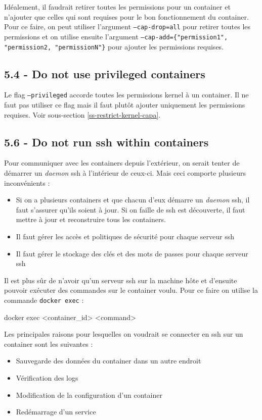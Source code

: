 \documentclass[11pt,a4paper,oneside]{report}
\newcommand{\code}[1]{\texttt{#1}}
\begin{document}
Idéalement, il faudrait retirer toutes les permissions pour un container et n'ajouter que celles qui sont requises pour le bon fonctionnement du container. Pour ce faire, on peut utiliser l'argument \code{--cap-drop=all} pour retirer toutes les permissions et on utilise ensuite l'argument \code{--cap-add=\{"permission1", "permission2, "permissionN"\}} pour ajouter les permissions requises.

\subsection{5.4  - Do not use privileged containers}
Le flag \code{--privileged} accorde toutes les permissions kernel à un container. Il ne faut pas utiliser ce flag mais il faut plutôt ajouter uniquement les permissions requises. Voir sous-section \ref{ss-restrict-kernel-capa}.

\subsection{5.6  - Do not run ssh within containers}
Pour communiquer avec les containers depuis l'extérieur, on serait tenter de démarrer un \textit{daemon} ssh à l'intérieur de ceux-ci. Mais ceci comporte plusieurs inconvénients :

\begin{itemize}
\item Si on a plusieurs containers et que chacun d'eux démarre un \textit{daemon} ssh, il faut s'assurer qu'ils soient à jour. Si on faille de ssh est découverte, il faut mettre à jour et reconstruire tous les containers.
\item Il faut gérer les accès et politiques de sécurité pour chaque serveur ssh
\item Il faut gérer le stockage des clés et des mots de passes pour chaque serveur ssh
\end{itemize}

Il est plus sûr de n'avoir qu'un serveur ssh sur la machine hôte et d'ensuite pouvoir exécuter des commandes sur le container voulu. Pour ce faire on utilise la commande \code{docker exec} :

\begin{textcode}
docker exec <container_id> <command> 
\end{textcode}

Les principales raisons pour lesquelles on voudrait se connecter en ssh sur un container sont les suivantes :
\begin{itemize}
\item Sauvegarde des données du container dans un autre endroit
\item Vérification des logs
\item Modification de la configuration d'un container
\item Redémarrage d'un service
\end{itemize}
\end{document}
